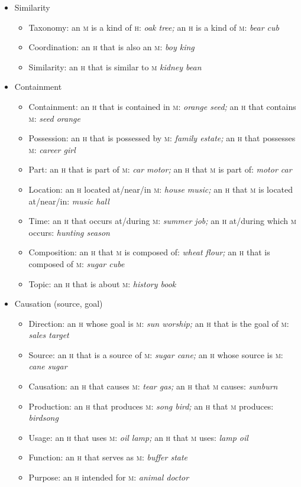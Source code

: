 \documentclass[11pt]{article}
\newcommand{\E}[1]{\textit{#1}}   %
\newcommand{\I}[1]{\textsc{#1}}   %
\newenvironment{grammarlist}%
 {\begin{itemize}\addtolength{\itemsep}{-0.5\baselineskip}\ignorespaces}%
 {\end{itemize}\ignorespacesafterend}
\begin{document}
\begin{grammarlist}
  \item Similarity
    \begin{grammarlist}
      \item Taxonomy: an \I{m} is a kind of \I{h}: \E{oak tree;} an
        \I{h} is a kind of \I{m}: \E{bear cub}
      \item Coordination: an \I{h} that is also an \I{m}: \E{boy king}
      \item Similarity: an \I{h} that is similar to \I{m} \E{kidney bean}
    \end{grammarlist}  
  \item Containment
    \begin{grammarlist}
      \item Containment: an \I{h} that is contained in \I{m}:
        \E{orange seed;} an \I{h} that contains \I{m}: \E{seed orange}
      \item Possession: an \I{h} that is possessed by \I{m}: \E{family
        estate;} an \I{h} that possesses \I{m}: \E{career girl}
      \item Part: an \I{h} that is part of \I{m}: \E{car motor;} an
        \I{h} that \I{m} is part of: \E{motor car}
      \item Location: an \I{h} located at/near/in \I{m}: \E{house
        music;} an \I{h} that \I{m} is located at/near/in: \E{music
        hall}
      \item Time: an \I{h} that occurs at/during \I{m}: \E{summer
        job;} an \I{h} at/during which \I{m} occurs: \E{hunting season}
      \item Composition: an \I{h} that \I{m} is composed of: \E{wheat
        flour;} an \I{h} that is composed of \I{m}: \E{sugar cube}
      \item Topic: an \I{h} that is about \I{m}: \E{history book}
    \end{grammarlist}
  \item Causation (source, goal)
    \begin{grammarlist}
      \item Direction: an \I{h} whose goal is \I{m}: \E{sun worship;}
        an \I{h} that is the goal of \I{m}: \E{sales target}
      \item Source: an \I{h} that is a source of \I{m}: \E{sugar cane;}
        an \I{h} whose source is \I{m}: \E{cane sugar}
      \item Causation: an \I{h} that causes \I{m}: \E{tear gas;}
        an \I{h} that \I{m} causes: \E{sunburn}
      \item Production: an \I{h} that produces \I{m}: \E{song bird;}
        an \I{h} that \I{m} produces: \E{birdsong}
      \item Usage: an \I{h} that uses \I{m}: \E{oil lamp;}
        an \I{h} that \I{m} uses: \E{lamp oil}
      \item Function: an \I{h} that serves as \I{m}: \E{buffer state}
      \item Purpose: an \I{h} intended for \I{m}: \E{animal doctor}
    \end{grammarlist}
\end{grammarlist}
\end{document}
